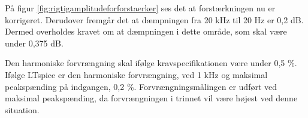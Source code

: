 På figur \ref{fig:rigtigamplitudeforforstaerker} ses det at forstærkningen nu er korrigeret. Derudover fremgår det at dæmpningen fra 20 kHz til 20 Hz er 0,2 dB. Dermed overholdes kravet om at dæmpningen i dette område, som skal være under 0,375 dB. 

Den harmoniske forvrængning skal ifølge kravspecifikationen være under 0,5 \%. Ifølge LTspice er den harmoniske forvrængning, ved 1 kHz og maksimal peakspænding på indgangen, 0,2 \%. Forvrængningsmålingen er udført ved maksimal peakspænding, da forvrængningen i trinnet vil være højest ved denne situation. 